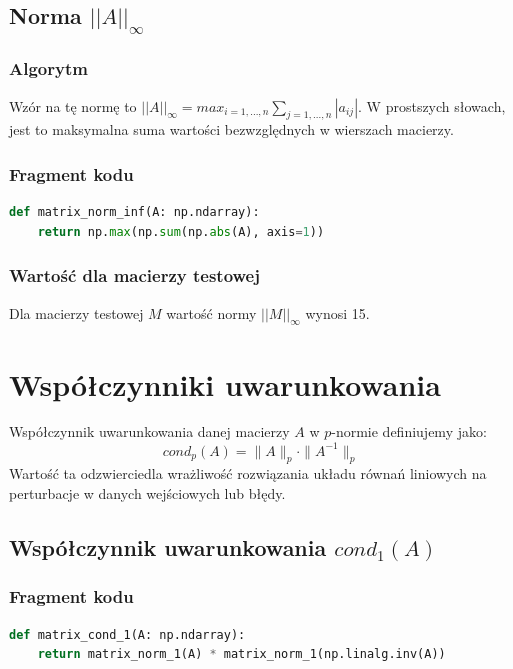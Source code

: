 \documentclass[a4paper]{article}
\begin{document}
\subsection{Norma $||A||_{\infty}$}

\subsubsection{Algorytm}
Wzór na tę normę to
$||A||_{\infty} = max_{i=1,...,n}\sum_{j=1,...,n}|a_{ij}|$. W prostszych słowach,
jest to maksymalna suma wartości bezwzględnych w wierszach macierzy.

\subsubsection{Fragment kodu}

\begin{lstlisting}[language=python]
def matrix_norm_inf(A: np.ndarray):
    return np.max(np.sum(np.abs(A), axis=1))
\end{lstlisting}

\subsubsection{Wartość dla macierzy testowej}

Dla macierzy testowej $M$ wartość normy $||M||_{\infty}$ wynosi 15.


\section{Współczynniki uwarunkowania}

Współczynnik uwarunkowania danej macierzy $A$ w $p$-normie definiujemy jako:
\[
cond_{p}(A) = \|A\|_p \cdot \|A^{-1}\|_p
\]
Wartość ta odzwierciedla wrażliwość rozwiązania układu równań liniowych na perturbacje w danych wejściowych lub błędy.



\subsection{Współczynnik uwarunkowania $cond_1(A)$}

\subsubsection{Fragment kodu}

\begin{lstlisting}[language=python]
def matrix_cond_1(A: np.ndarray):
    return matrix_norm_1(A) * matrix_norm_1(np.linalg.inv(A))
\end{lstlisting}
\end{document}
